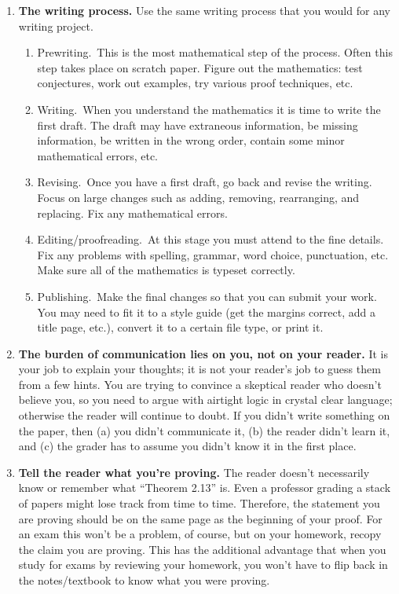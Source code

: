 \begin{enumerate}

\item \textbf{The writing process.}  Use the same writing process that you would for any writing project.
\begin{enumerate}
\item Prewriting.~This is the most mathematical step of the process. Often this step takes place on scratch paper. Figure out the mathematics: test conjectures, work out examples, try various proof techniques, etc. 
\item Writing.~When you understand the mathematics it is time to write the first draft. The draft may have extraneous information, be missing  information, be written in the wrong order, contain some minor mathematical errors, etc.
\item Revising.~Once you have a first draft, go back and revise the writing. Focus on large changes such as adding, removing, rearranging, and replacing. Fix any mathematical errors. 
\item Editing/proofreading.~At this stage you must attend to the fine details. Fix any problems with spelling, grammar, word choice, punctuation, etc. Make sure all of the mathematics is typeset correctly.
\item Publishing.~Make the final changes so that you can submit your work. You may need to fit it to a style guide (get the margins correct, add a title page, etc.), convert it to a certain file type, or print it.
\end{enumerate}

\item \textbf{The burden of communication lies on you, not on your reader.}
It is your job to explain your thoughts; it is not your reader's job to guess them from a few hints. You are trying to convince a skeptical reader who doesn't believe you, so you need to argue with airtight logic in crystal clear language;
otherwise the reader will continue to doubt.
If you didn't write something on the paper, then (a) you didn't communicate it, (b) the reader didn't learn it, and (c) the grader has to assume you didn't know it in the first place.
  
\item \textbf{Tell the reader what you're proving.} The reader doesn't necessarily know or remember what ``Theorem 2.13'' is. Even a professor grading a stack of papers might lose track from time to time. Therefore, the statement you are proving should be on the same page as the beginning of your proof. For an exam this won't be a problem, of course, but on your homework, recopy the claim you are proving. This has the additional advantage that when you study for exams by reviewing your homework, you won't have to flip back in the notes/textbook to know what you were proving.


\end{enumerate}
